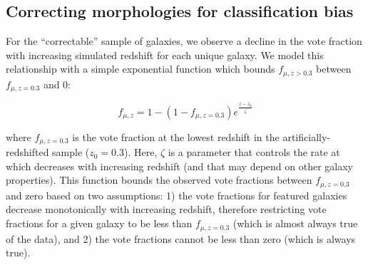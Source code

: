 \documentclass[a4paper,fleqn,usenatbib]{mnras}
\begin{document}
\subsection{Correcting morphologies for classification bias}\label{ssec:zeta}

For the ``correctable'' sample of galaxies, we observe a decline in the vote fraction
\ffeatures{} with increasing simulated redshift for each unique galaxy. 
We model this relationship with a simple exponential
function which bounds $f_{\mu, z>0.3}$  between $f_{\mu, z=0.3}$ and 0:

\begin{equation}
f_{\mu,z} = 1 - (1 - f_{\mu,z=0.3})e^{\frac{z-z_0}{\hat\zeta}}
\label{eqn:fzeta}
\end{equation}



\noindent where $f_{\mu,z=0.3}$ is the vote fraction at the lowest redshift in
the artificially-redshifted sample ($z_0=0.3$). Here, $\zeta$ is a parameter that
controls the rate at which \ffeatures{} decreases with increasing redshift (and
that may depend on other galaxy properties). This function bounds the observed
vote fractions between $f_{\mu,z=0.3}$ and zero based on two assumptions: 1)
the vote fractions for featured galaxies decrease monotonically with increasing
redshift, therefore restricting vote fractions for a given galaxy to be less
than $f_{\mu,z=0.3}$ (which is almost always true of the data), and 2) the
vote fractions cannot be less than zero (which is always true).
\end{document}

